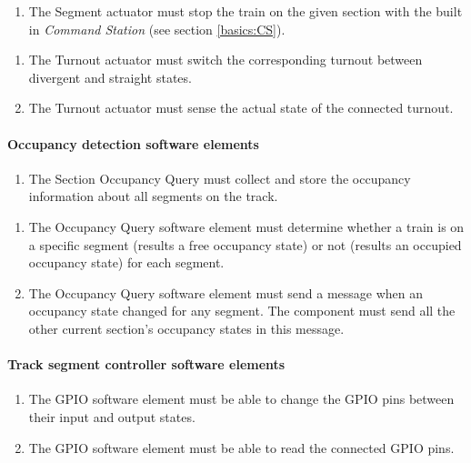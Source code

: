 \begin{enumerate}[label=REQ-SA-\arabic*, leftmargin=*, format=\small]
	\item The Segment actuator must stop the train on the given section with the built in \textit{Command Station} (see section \ref{basics:CS}).
\end{enumerate}

\begin{enumerate}[label=REQ-TA-\arabic*, leftmargin=*, format=\small]
	\item The Turnout actuator must switch the corresponding turnout between divergent and straight states.
	\item The Turnout actuator must sense the actual state of the connected turnout.
\end{enumerate}

\paragraph{Occupancy detection software elements}
\begin{enumerate}[label=REQ-SOQ-\arabic*, leftmargin=*, format=\small]
	\item The Section Occupancy Query must collect and store the occupancy information about all segments on the track. \label{req:SOQ}
\end{enumerate}

\begin{enumerate}[label=REQ-OCQ-\arabic*, leftmargin=*, format=\small] 
	\item The Occupancy Query software element must determine whether a train is on a specific segment (results a free occupancy state) or not (results an occupied occupancy state) for each segment.  \label{req:OCQ-1}
	\item The Occupancy Query software element must send a message when an occupancy state changed for any segment. The component must send all the other current section's occupancy states in this message. \label{req:OCQ-2}
\end{enumerate}

\paragraph{Track segment controller software elements}
\begin{enumerate}[label=REQ-GPIO-\arabic*, leftmargin=*, format=\small] 
	\item The GPIO software element must be able to change the GPIO pins between their input and output states. \label{req:GPIO-1}
	\item The GPIO software element must be able to read the connected GPIO pins. \label{req:GPIO-2}
\end{enumerate}

